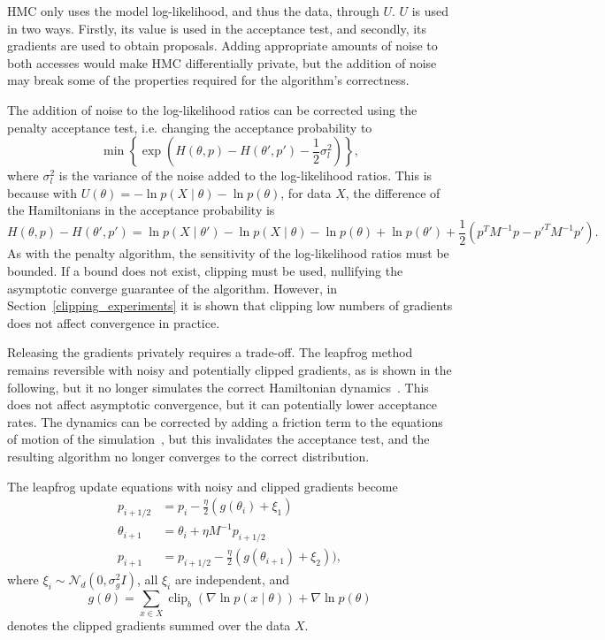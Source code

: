 \documentclass[english,twoside,openright]{HYgraduMLDS}
\newcommand{\caln}{{\mathcal{N}}}
\DeclareMathOperator{\clip}{clip}
\begin{document}
HMC only uses the model log-likelihood, and thus the data, through \(U\).
\(U\) is used in two ways. Firstly, its value is used in the acceptance test,
and secondly, its gradients are used to obtain proposals. Adding appropriate
amounts of noise to both accesses would make HMC differentially private, but the addition of
noise may break some of the properties required for the algorithm's correctness.

The addition of noise to the log-likelihood ratios can be corrected using the penalty
acceptance test, i.e. changing the acceptance probability to
\[
    \min\left\{\exp\left(H(\theta, p) - H(\theta', p') - \frac{1}{2}\sigma_{l}^{2}\right)\right\},
\]
where \(\sigma_{l}^{2}\) is the variance of the noise added to the log-likelihood
ratios. This is because with
\(U(\theta) = -\ln p(X\mid \theta) - \ln p(\theta)\),  for data \(X\),
the difference of the Hamiltonians in the acceptance probability is
\[
  H(\theta, p) - H(\theta', p') = \ln p(X\mid \theta') - \ln p(X\mid \theta)
  - \ln p(\theta) + \ln p(\theta')
  + \frac{1}{2}(p^{T}M^{-1}p - p'^{T}M^{-1}p').
\]
As with the penalty algorithm, the sensitivity of the log-likelihood ratios must
be bounded. If a bound does not exist, clipping must be used, nullifying the asymptotic
converge guarantee of the algorithm. However, in Section~\ref{clipping_experiments}
it is shown that
clipping low numbers of gradients does not affect convergence in practice.

Releasing the gradients privately requires a trade-off. The leapfrog method remains
reversible with noisy and potentially clipped gradients, as is shown in the following,
but it no longer simulates the correct Hamiltonian dynamics~\cite{CFG14}. This does not affect
asymptotic convergence, but it can potentially lower acceptance rates.
The dynamics can be corrected by adding a friction term to the equations of
motion of the simulation~\cite{CFG14}, but this invalidates the acceptance test,
and the resulting algorithm no longer converges to the correct distribution.

The leapfrog update equations with noisy and clipped gradients become
\begin{align*}
  p_{i+1/2} &= p_{i} - \frac{\eta}{2}(g(\theta_{i}) + \xi_{1}) \\
  \theta_{i+1} &= \theta_{i} + \eta M^{-1}p_{i+1/2} \\
  p_{i+1} &= p_{i+1/2} - \frac{\eta}{2}(g(\theta_{i+1}) + \xi_{2})),
\end{align*}
where
\(\xi_{i} \sim \caln_{d}(0, \sigma_{g}^{2}I)\), all \(\xi_{i}\) are independent, and
\[
  g(\theta) = \sum_{x\in X}\clip_{b}(\nabla \ln p(x\mid \theta)) + \nabla\ln p(\theta)
\]
denotes the clipped gradients summed over the data \(X\).
\end{document}
